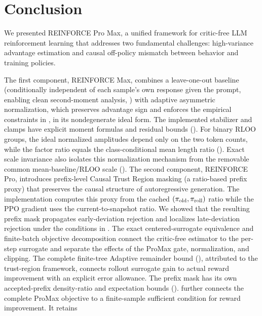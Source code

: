 \section{Conclusion}
\label{sec:conclusion}

We presented REINFORCE Pro Max, a unified framework for critic-free LLM reinforcement learning that addresses two fundamental challenges:
high-variance advantage estimation and causal off-policy mismatch between behavior and training policies.

The first component, REINFORCE Max, combines a leave-one-out baseline (conditionally independent of each sample's own response given the prompt, enabling clean
second-moment analysis, ) with adaptive asymmetric normalization, which preserves advantage sign and enforces the
empirical constraints in ,  in its nondegenerate ideal form. The implemented stabilizer and
clamps have explicit moment formulas and residual bounds ().
For binary RLOO groups, the ideal normalized amplitudes depend only on the
two token counts, while the factor ratio equals the class-conditional mean
length ratio (). Exact scale invariance
also isolates this normalization mechanism from the removable common
mean-baseline/RLOO scale ().
The second component, REINFORCE Pro, introduces
prefix-level Causal Trust Region masking (a ratio-based prefix proxy) that preserves the causal structure of autoregressive generation.
The implementation computes this proxy from the cached $(\pi_{\mathrm{old}},\pi_{\mathrm{roll}})$ ratio
while the PPO gradient uses the current-to-snapshot ratio. We showed that the
resulting prefix mask propagates early-deviation rejection and localizes late-deviation rejection under the conditions in
. The exact centered-surrogate equivalence and finite-batch objective decomposition connect the critic-free
estimator to the per-step surrogate and separate the effects of the ProMax gate, normalization, and clipping.
The complete finite-tree Adaptive remainder bound
(), attributed to the trust-region framework,
connects rollout surrogate gain to actual reward improvement with an explicit
error allowance. The prefix mask has its own accepted-prefix density-ratio
and expectation bounds ().
 further connects the complete ProMax objective
to a finite-sample sufficient condition for reward improvement. It retains
